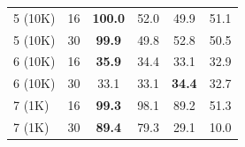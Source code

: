 \documentclass[twoside]{article}
\begin{document}
\begin{table}[t]
\begin{center}
\begin{small}
\begin{sc}
\begin{tabular}{lc|cccc}
    5 (10K) & 16 & \textbf{100.0} & 52.0          & 49.9          & 51.1 \\
    5 (10K) & 30 & \textbf{99.9}  & 49.8          & 52.8          & 50.5 \\
    6 (10K) & 16 & \textbf{35.9}  & 34.4          & 33.1          & 32.9 \\
    6 (10K) & 30 & 33.1           & 33.1          & \textbf{34.4} & 32.7 \\
    7 (1K)  & 16 & \textbf{99.3}  & 98.1          & 89.2          & 51.3 \\
    7 (1K)  & 30 & \textbf{89.4}  & 79.3          & 29.1          & 10.0 \\
    
\end{tabular}
\end{sc}
\end{small}
\end{center}
\vskip -0.1in
\end{table}
%
\end{document}
